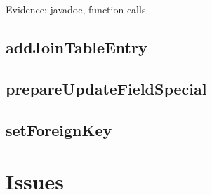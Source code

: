 \documentclass[18pt,oneside,a4paper, titlepage]{article}
\begin{document}
	Evidence: javadoc, function calls
	
	\subsection{addJoinTableEntry}
	\subsection{prepareUpdateFieldSpecial}
	\subsection{setForeignKey}

\newpage
\section{Issues}
\end{document}
